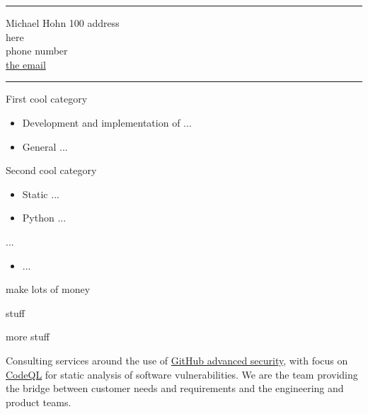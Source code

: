 \documentclass[10pt]{article}
\begin{document}
\noindent\rule{\textwidth}{.005in}\vspace{1ex}

\header
{Michael Hohn}
{100 address\\
 here \\
 }
{%
 phone number  \\
\href{mailto:the email}{the email}
\vspace{2ex}}
%
\noindent\rule{\linewidth}{.005in}
%

\begin{llist}

\noindent{}
\noindent{}
First cool category
\begin{itemize}
\item Development and implementation of ...
\item General ...
\end{itemize}

\noindent{}
Second cool category
\begin{itemize}
\item Static ...
\item Python ...
\end{itemize}

\noindent{}
...
\begin{itemize}
\item ...
\end{itemize}

 make lots of money

\begin{items}

\item stuff
\item more stuff
  \end{items}



% 
\noindent
Consulting services around the use of
\href{https://github.com/features/security}{GitHub advanced security}, with focus
on \href{https://codeql.github.com}{CodeQL} for static analysis of software
vulnerabilities.  We are the team providing the bridge between customer needs and
requirements and the engineering and product teams.


\end{llist}
\end{document}
